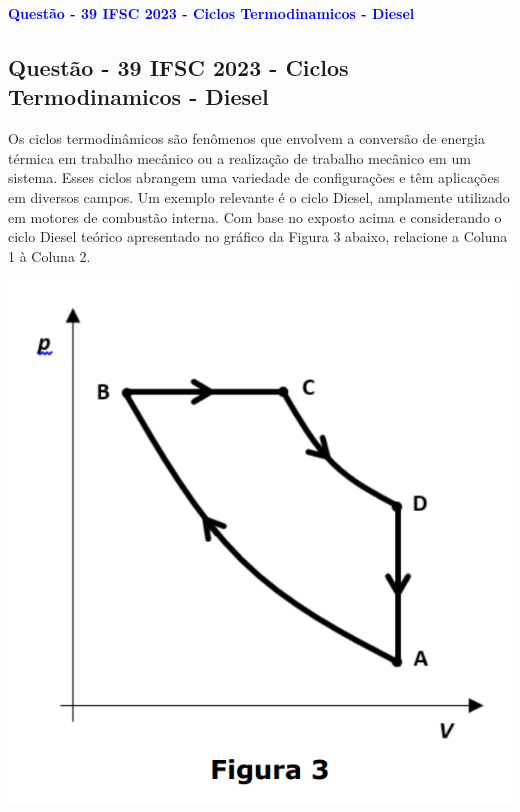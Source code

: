 \begin{flushleft}
\textbf{\textcolor{blue}{\Large Quest\~ao - 39 IFSC 2023 - Ciclos Termodinamicos - Diesel}}\\
\noindent

\subsection{Quest\~ao - 39 IFSC 2023 - Ciclos Termodinamicos - Diesel}

Os ciclos termodin\^amicos s\~ao fen\^omenos que envolvem a convers\~ao de energia t\'ermica em trabalho mec\^anico ou a 
realiza\c{c}\~ao de trabalho mec\^anico em um sistema. Esses ciclos abrangem uma variedade de configura\c{c}\~oes e t\^em 
aplica\c{c}\~oes em diversos campos. Um exemplo relevante \'e o ciclo Diesel, amplamente utilizado em motores de combust\~ao 
interna. Com base no exposto acima e considerando o ciclo Diesel te\'orico apresentado no gr\'afico da Figura 3 abaixo, 
relacione a Coluna 1 \`a Coluna 2.

\begin{center}
\centering
\includegraphics[scale=0.5]{figures/ciclo-termodinamico-diesel.png}
\end{center}

\bigskip


\end{flushleft}
